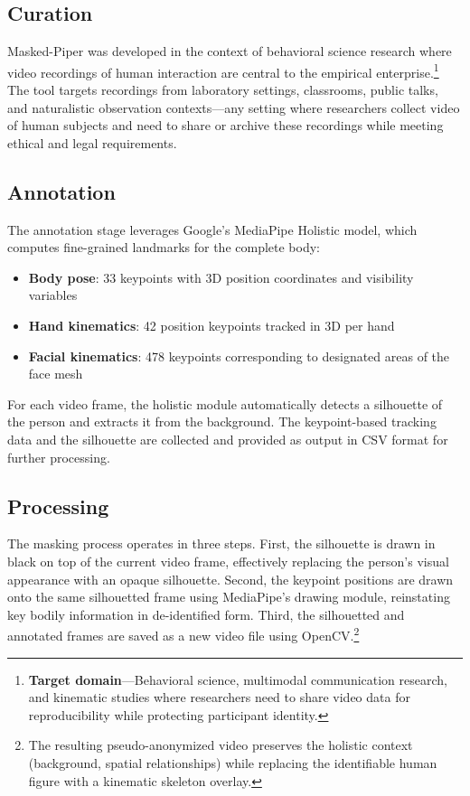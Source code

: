 \documentclass[../main.tex]{subfiles}
\begin{document}
\subsection{Curation}

Masked-Piper was developed in the context of behavioral science research where video recordings of human interaction are central to the empirical enterprise.\footnote{\textbf{Target domain}---Behavioral science, multimodal communication research, and kinematic studies where researchers need to share video data for reproducibility while protecting participant identity.} The tool targets recordings from laboratory settings, classrooms, public talks, and naturalistic observation contexts---any setting where researchers collect video of human subjects and need to share or archive these recordings while meeting ethical and legal requirements.

\subsection{Annotation}

The annotation stage leverages Google's MediaPipe Holistic model, which computes fine-grained landmarks for the complete body:

\begin{itemize}
    \item \textbf{Body pose}: 33 keypoints with 3D position coordinates and visibility variables
    \item \textbf{Hand kinematics}: 42 position keypoints tracked in 3D per hand
    \item \textbf{Facial kinematics}: 478 keypoints corresponding to designated areas of the face mesh
\end{itemize}

For each video frame, the holistic module automatically detects a silhouette of the person and extracts it from the background. The keypoint-based tracking data and the silhouette are collected and provided as output in CSV format for further processing.

\subsection{Processing}

The masking process operates in three steps. First, the silhouette is drawn in black on top of the current video frame, effectively replacing the person's visual appearance with an opaque silhouette. Second, the keypoint positions are drawn onto the same silhouetted frame using MediaPipe's drawing module, reinstating key bodily information in de-identified form. Third, the silhouetted and annotated frames are saved as a new video file using OpenCV.\footnote{The resulting pseudo-anonymized video preserves the holistic context (background, spatial relationships) while replacing the identifiable human figure with a kinematic skeleton overlay.}
\end{document}
